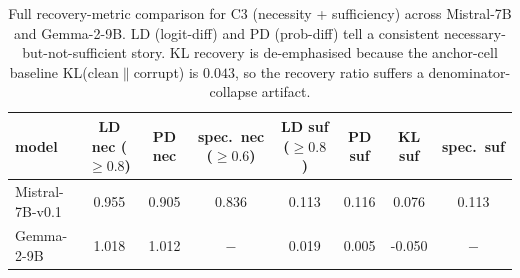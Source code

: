 
\begin{table}[t]
\centering
\caption{Full recovery-metric comparison for C3 (necessity + sufficiency) across Mistral-7B and Gemma-2-9B. LD (logit-diff) and PD (prob-diff) tell a consistent necessary-but-not-sufficient story. KL recovery is de-emphasised because the anchor-cell baseline KL(clean$\parallel$corrupt) is $0.043$, so the recovery ratio suffers a denominator-collapse artifact.}
\label{tab:c3_metric_comparison}
\begin{tabular}{lccccccc}
\toprule
model & LD nec ($\geq 0.8$) & PD nec & spec.\ nec ($\geq 0.6$) & LD suf ($\geq 0.8$) & PD suf & KL suf & spec.\ suf \\
\midrule
Mistral-7B-v0.1 & 0.955 & 0.905 & 0.836 & 0.113 & 0.116 & 0.076 & 0.113 \\
Gemma-2-9B & 1.018 & 1.012 & $-$ & 0.019 & 0.005 & -0.050 & $-$ \\
\bottomrule
\end{tabular}
\end{table}
